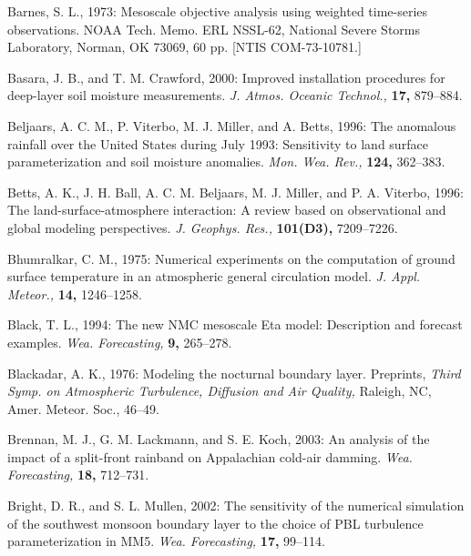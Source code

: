 \documentclass[twocolumn]{article}
\begin{document}
\begin{references}
{\footnotesize

\item Barnes, S. L., 1973: Mesoscale objective analysis using weighted time-series observations. NOAA Tech. Memo. ERL NSSL-62, National Severe Storms Laboratory, Norman, OK 73069, 60 pp. [NTIS COM-73-10781.]

\item Basara, J. B., and T. M. Crawford, 2000: Improved installation procedures for deep-layer soil moisture measurements. \textit{J. Atmos. Oceanic Technol.,} \textbf{17,} 879--884.

\item Beljaars, A. C. M., P. Viterbo, M. J. Miller, and A. Betts, 1996: The anomalous rainfall over the United States during July 1993: Sensitivity to land surface parameterization and soil moisture anomalies. \textit{Mon. Wea. Rev.,} \textbf{124,} 362--383.

\item Betts, A. K., J. H. Ball, A. C. M. Beljaars, M. J. Miller, and P. A. Viterbo, 1996: The land-surface-atmosphere interaction: A review based on observational and global modeling perspectives. \textit{J. Geophys. Res.,} \textbf{101(D3),} 7209--7226.

\item Bhumralkar, C. M., 1975: Numerical experiments on the computation of ground surface temperature in an atmospheric general circulation model. \textit{J. Appl. Meteor.,} \textbf{14,} 1246--1258.

\item Black, T. L., 1994: The new NMC mesoscale Eta model: Description and forecast examples. \textit{Wea. Forecasting,} \textbf{9,} 265--278.

\item Blackadar, A. K., 1976: Modeling the nocturnal boundary layer. Preprints, \textit{ Third Symp. on Atmospheric Turbulence, Diffusion and Air Quality,} Raleigh, NC, Amer. Meteor. Soc., 46--49.

\item Brennan, M. J., G. M. Lackmann, and S. E. Koch, 2003: An analysis of the impact of a split-front rainband on Appalachian cold-air damming. \textit{Wea. Forecasting,} \textbf{18,} 712--731.

\item Bright, D. R., and S. L. Mullen, 2002: The sensitivity of the numerical simulation of the southwest monsoon boundary layer to the choice of PBL turbulence parameterization in MM5. \textit{Wea. Forecasting,} \textbf{17,} 99--114.

}
\end{references}
\end{document}

